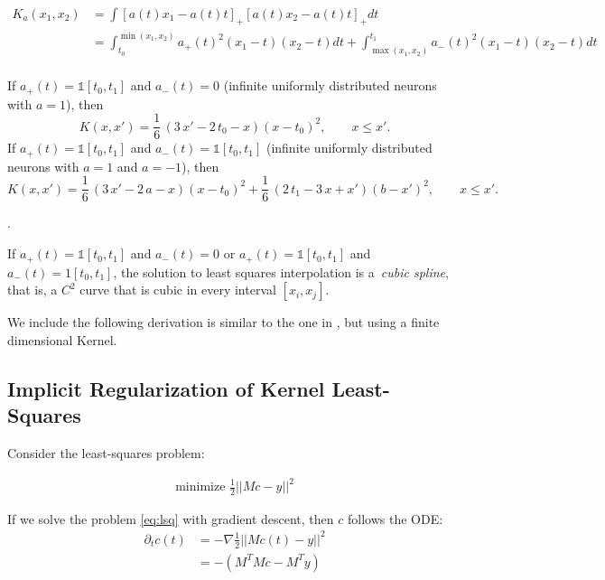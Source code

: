 \begin{equation}
\begin{aligned}
K_a(x_1,x_2) &= \int [a(t) x_1 - a(t)t]_+ [a(t) x_2 - a(t)t]_+ dt\\
&= \int_{t_0}^{\min(x_1,x_2)} a_+(t)^2 (x_1 - t) (x_2 - t)
dt + \int_{\max(x_1,x_2)}^{t_1} a_{-}(t)^2 (x_1 - t) (x_2 - t) dt\\
\end{aligned}
\end{equation}

\begin{proposition} If $a_+(t) = \mathds 1[t_0,t_1]$ and $a_-(t) = 0$ (infinite uniformly distributed neurons with $a=1$), then
\[
K(x, x') = \frac{1}{6} \, {\left(3 \, x' -2 \, t_0 - x\right)} {\left(x-t_0\right)}^{2}, \qquad x \le x'.
\]
If $a_+(t) = \mathds 1[t_0,t_1]$ and  $a_-(t) = \mathds 1[t_0,t_1]$ (infinite uniformly distributed neurons with $a=1$ and $a=-1$), then
\[
K(x, x') = \frac{1}{6} \, {\left(3 \, x' - 2 \, a - x \right)} {\left(x - t_0\right)}^{2} + \frac{1}{6} \, {\left(2 \, t_1 - 3 \, x + x'\right)} {\left(b - x'\right)}^{2}, \qquad x \le x'.
\]
\end{proposition}

.

\begin{corollary}
If $a_+(t) = \mathds 1[t_0,t_1]$ and $a_-(t) = 0$ or $a_+(t) = \mathds 1
[t_0,t_1]$ and $a_-(t) = 1[t_0,t_1]$, the solution to least squares interpolation is a~\emph{cubic spline}, that is, a $C^2$ curve that is cubic in every interval $[x_i,x_j]$.
\end{corollary}

We include the following derivation is similar to the one in \cite{NTKJacot}, but using a finite dimensional Kernel.

\subsection{Implicit Regularization of Kernel Least-Squares}
Consider the least-squares problem:

\begin{equation}\label{eq:lsq}
\begin{gathered}
    \text{minimize } \frac{1}{2} ||Mc - y||^2
\end{gathered}
\end{equation}

If we solve the problem \eqref{eq:lsq} with gradient descent, then $c$ follows the ODE:
\begin{align}
    \partial_t c(t) &= - \nabla \frac{1}{2} ||Mc(t) - y||^2\\
                    &= -(M^T M c - M^T y)
\end{align}

